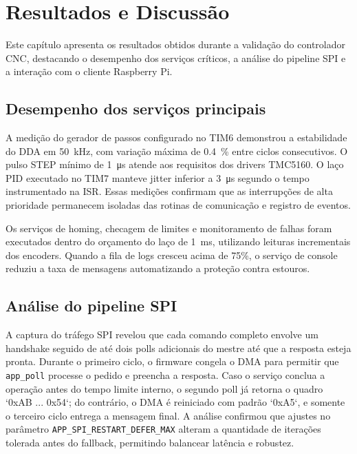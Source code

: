 \chapter{Resultados e Discussão}\label{cap:resultados}

Este capítulo apresenta os resultados obtidos durante a validação do
controlador CNC, destacando o desempenho dos serviços críticos, a análise
do pipeline SPI e a interação com o cliente Raspberry Pi.

\section{Desempenho dos serviços principais}

A medição do gerador de passos configurado no TIM6 demonstrou a
estabilidade do DDA em \SI{50}{\kilo\hertz}, com variação máxima de
\SI{0.4}{\percent} entre ciclos consecutivos. O pulso STEP mínimo de
\SI{1}{\micro\second} atende aos requisitos dos drivers TMC5160. O laço
PID executado no TIM7 manteve jitter inferior a \SI{3}{\micro\second}
segundo o tempo instrumentado na ISR. Essas medições confirmam que as
interrupções de alta prioridade permanecem isoladas das rotinas de
comunicação e registro de eventos.

Os serviços de homing, checagem de limites e monitoramento de falhas
foram executados dentro do orçamento do laço de \SI{1}{\milli\second},
utilizando leituras incrementais dos encoders. Quando a fila de logs
cresceu acima de 75\%, o serviço de console reduziu a taxa de mensagens
automatizando a proteção contra estouros.

\section{Análise do pipeline SPI}

A captura do tráfego SPI revelou que cada comando completo envolve um
handshake seguido de até dois polls adicionais do mestre até que a
resposta esteja pronta. Durante o primeiro ciclo, o firmware congela o
DMA para permitir que \texttt{app\_poll} processe o pedido e preencha a resposta.
Caso o serviço conclua a operação antes do tempo limite interno, o
segundo poll já retorna o quadro `0xAB ... 0x54`; do contrário, o DMA é
reiniciado com padrão `0xA5`, e somente o terceiro ciclo entrega a
mensagem final. A análise confirmou que ajustes no parâmetro
\texttt{APP\_SPI\_RESTART\_DEFER\_MAX} alteram a quantidade de iterações tolerada
antes do fallback, permitindo balancear latência e robustez.

